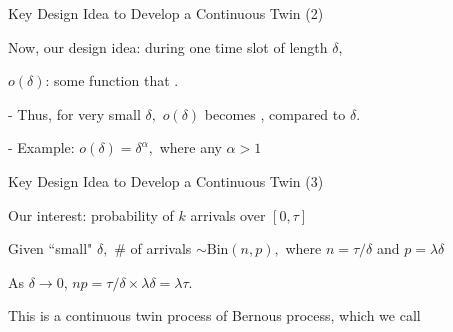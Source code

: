 \begin{frame}{Key Design Idea to Develop a Continuous Twin (2)}

\begin{center}
\end{center}
\vspace{-0.8cm}
\plitemsep 0.1in
\bci
\item<1-> Now, our design idea: during one time slot of length $\delta$,
{
}
{
}
\vspace{-0.3cm}
\item<9-> $o(\delta)$: some function that .

- Thus, for very small $\delta,$ $o(\delta)$ becomes ,
compared to $\delta$.

- Example: $o(\delta)= \delta^\alpha,$ where any $\alpha >1$



\eci
\end{frame}

\begin{frame}{Key Design Idea to Develop a Continuous Twin (3)}

\begin{center}
\end{center}
\vspace{-0.8cm}
\plitemsep 0.1in
\bci
\item<1-> Our interest: probability of $k$ arrivals over $[0,\tau]$

\item<2-> Given ``small" $\delta,$ \# of arrivals $\sim \text{Bin}(n,p),$ where $n = \tau/\delta$ and $p =\lambda \delta$

\item<3-> As $\delta \rightarrow 0$, $np = \tau/\delta \times \lambda \delta = \lambda \tau.$

\item<4-> 

\item<5-> This is a continuous twin process of Bernous process, which we call 

\eci
\end{frame}


